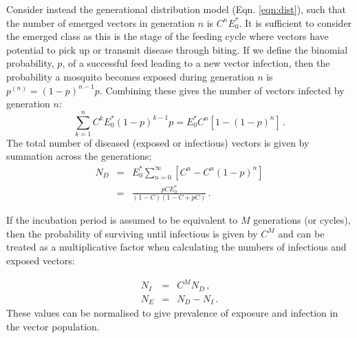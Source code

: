 Consider instead the generational distribution model (Eqn. \ref{eqn:dist}), such that the number of emerged vectors in generation $n$ is $C^nE_0^*$. It is sufficient to consider the emerged class as this is the stage of the feeding cycle where vectors have potential to pick up or transmit disease through biting. If we define the binomial probability, $p$, of a successful feed leading to a new vector infection, then the probability a mosquito becomes exposed during generation $n$ is $p^{(n)}=(1-p)^{n-1}p$. Combining these gives the number of vectors infected by generation $n$:
\begin{equation}
\sum_{k=1}^{n}C^kE_0^*(1-p)^{k-1}p = E_0^*C^n[1-(1-p)^n]\,.
\end{equation}
The total number of diseased (exposed or infectious) vectors is given by summation across the generations;
\begin{eqnarray}
N_D &=& E_0^*\sum_{n=0}^{\infty} [C^n - C^n(1-p)^n]\\
&=& \frac{pCE_0^*}{(1-C)(1-C+pC)}\,.
\end{eqnarray}

If the incubation period is assumed to be equivalent to $M$ generations (or cycles), then the probability of surviving until infectious is given by $C^M$ and can be treated as a multiplicative factor when calculating the numbers of infectious and exposed vectors:

\begin{eqnarray}
N_I &=& C^MN_D\,,\\
N_E &=& N_D - N_I\,.
\end{eqnarray}
These values can be normalised to give prevalence of exposure and infection in the vector population.

